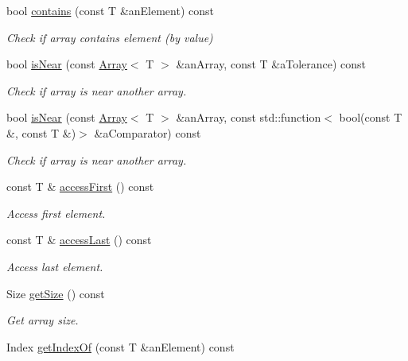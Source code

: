 \begin{DoxyCompactItemize}
bool \mbox{\hyperlink{classlibrary_1_1core_1_1ctnr_1_1_array_a9c423eb8a34dddc81e0ede9435094e99}{contains}} (const T \&an\+Element) const
\begin{DoxyCompactList}\small\item\em Check if array contains element (by value) \end{DoxyCompactList}\item 
bool \mbox{\hyperlink{classlibrary_1_1core_1_1ctnr_1_1_array_a752d42dba565118fbc49935ee1694944}{is\+Near}} (const \mbox{\hyperlink{classlibrary_1_1core_1_1ctnr_1_1_array}{Array}}$<$ T $>$ \&an\+Array, const T \&a\+Tolerance) const
\begin{DoxyCompactList}\small\item\em Check if array is near another array. \end{DoxyCompactList}\item 
bool \mbox{\hyperlink{classlibrary_1_1core_1_1ctnr_1_1_array_abb020c857d302fab11fac87b72527821}{is\+Near}} (const \mbox{\hyperlink{classlibrary_1_1core_1_1ctnr_1_1_array}{Array}}$<$ T $>$ \&an\+Array, const std\+::function$<$ bool(const T \&, const T \&)$>$ \&a\+Comparator) const
\begin{DoxyCompactList}\small\item\em Check if array is near another array. \end{DoxyCompactList}\item 
const T \& \mbox{\hyperlink{classlibrary_1_1core_1_1ctnr_1_1_array_afea012716d6cfffa2803606c0b244419}{access\+First}} () const
\begin{DoxyCompactList}\small\item\em Access first element. \end{DoxyCompactList}\item 
const T \& \mbox{\hyperlink{classlibrary_1_1core_1_1ctnr_1_1_array_ad95dcce8ddaf163903a2327f766dbc8a}{access\+Last}} () const
\begin{DoxyCompactList}\small\item\em Access last element. \end{DoxyCompactList}\item 
Size \mbox{\hyperlink{classlibrary_1_1core_1_1ctnr_1_1_array_a049307129c77f461b37ddca47edc7913}{get\+Size}} () const
\begin{DoxyCompactList}\small\item\em Get array size. \end{DoxyCompactList}\item 
Index \mbox{\hyperlink{classlibrary_1_1core_1_1ctnr_1_1_array_aa8a3e2745d72db8181b42e3cfb55415c}{get\+Index\+Of}} (const T \&an\+Element) const

\end{DoxyCompactItemize}
